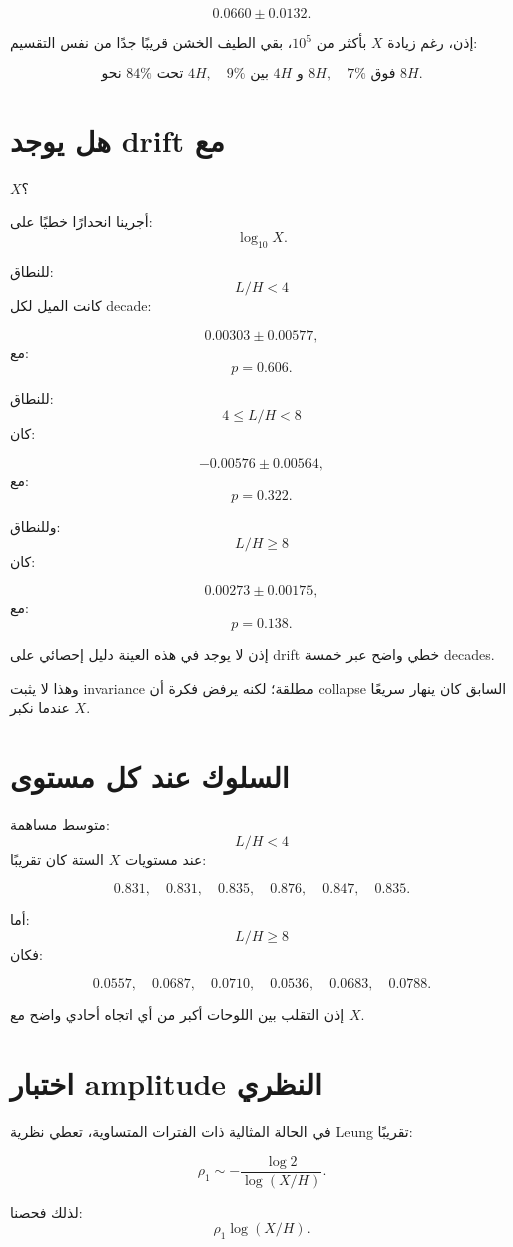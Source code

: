 \documentclass[12pt]{article}
\begin{document}
\[
\boxed{
0.0660\pm0.0132.
}
\]

إذن، رغم زيادة \(X\) بأكثر من \(10^5\)، بقي الطيف الخشن قريبًا جدًا من
نفس التقسيم:

\[
\boxed{
\text{نحو }84\%\text{ تحت }4H,
\quad
9\%\text{ بين }4H\text{ و }8H,
\quad
7\%\text{ فوق }8H.
}
\]

\section{هل يوجد drift مع } \(X\)؟

أجرينا انحدارًا خطيًا على:
\[
\log_{10}X.
\]

للنطاق:
\[
L/H<4
\]
كانت الميل لكل decade:

\[
0.00303\pm0.00577,
\]
مع:
\[
p=0.606.
\]

للنطاق:
\[
4\le L/H<8
\]
كان:

\[
-0.00576\pm0.00564,
\]
مع:
\[
p=0.322.
\]

وللنطاق:
\[
L/H\ge8
\]
كان:

\[
0.00273\pm0.00175,
\]
مع:
\[
p=0.138.
\]

إذن لا يوجد في هذه العينة دليل إحصائي على drift خطي واضح عبر خمسة decades.

وهذا لا يثبت invariance مطلقة؛ لكنه يرفض فكرة أن collapse السابق كان
ينهار سريعًا عندما نكبر \(X\).

\section{السلوك عند كل مستوى}

متوسط مساهمة:
\[
L/H<4
\]
عند مستويات \(X\) الستة كان تقريبًا:

\[
0.831,\quad
0.831,\quad
0.835,\quad
0.876,\quad
0.847,\quad
0.835.
\]

أما:
\[
L/H\ge8
\]
فكان:

\[
0.0557,\quad
0.0687,\quad
0.0710,\quad
0.0536,\quad
0.0683,\quad
0.0788.
\]

إذن التقلب بين اللوحات أكبر من أي اتجاه أحادي واضح مع \(X\).

\section{اختبار amplitude النظري}

في الحالة المثالية ذات الفترات المتساوية، تعطي نظرية Leung تقريبًا:

\[
\rho_1
\sim
-\frac{\log2}{\log(X/H)}.
\]

لذلك فحصنا:
\[
\rho_1\log(X/H).
\]
\end{document}
